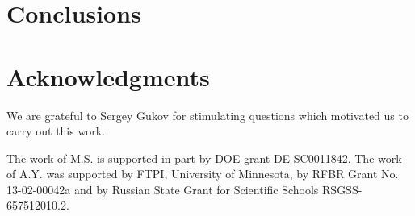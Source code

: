 \documentclass[epsfig,12pt]{article}
\begin{document}
\pagebreak
\section{Conclusions}
\label{sfinal}


\section*{Acknowledgments}

We are grateful to Sergey Gukov for stimulating questions  which motivated us to carry out this work.

	The work  of M.S. is supported in part by DOE grant DE-SC0011842. 
	The work of A.Y. was  supported 
	by  FTPI, University of Minnesota, 
	by RFBR Grant No. 13-02-00042a 
	and by Russian State Grant for 
	Scientific Schools RSGSS-657512010.2.




\newpage
\appendix
\setcounter{equation}{0}
\end{document}
